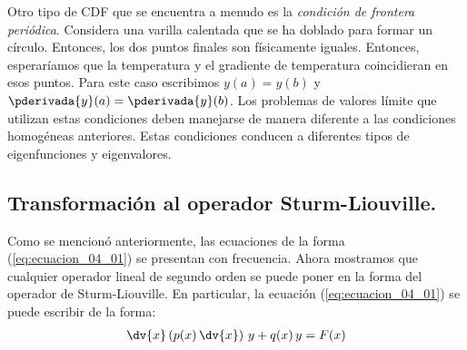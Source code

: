 \par
Otro tipo de CDF que se encuentra a menudo es la \emph{condición de frontera periódica}. Considera una varilla calentada que se ha doblado para formar un círculo. Entonces, los dos puntos finales son físicamente iguales. Entonces, esperaríamos que la temperatura y el gradiente de temperatura coincidieran en esos puntos. Para este caso escribimos $y (a) = y (b)$ y $\pderivada{y} (a) = \pderivada{y} (b)$. Los problemas de valores límite que utilizan estas condiciones deben manejarse de manera diferente a las condiciones homogéneas anteriores. Estas condiciones conducen a diferentes tipos de eigenfunciones y eigenvalores.

\subsection{Transformación al operador Sturm-Liouville.}

Como se mencionó anteriormente, las ecuaciones de la forma (\ref{eq:ecuacion_04_01}) se presentan con frecuencia. Ahora mostramos que cualquier operador lineal de segundo orden se puede poner en la forma del operador de Sturm-Liouville. En particular, la ecuación (\ref{eq:ecuacion_04_01}) se puede escribir de la forma:
\begin{align}
\dv{x} \left( p(x) \, \dv{x} \right) \, y + q(x) \, y =  F(x)
\label{eq:ecuacion_04_05}
\end{align}

